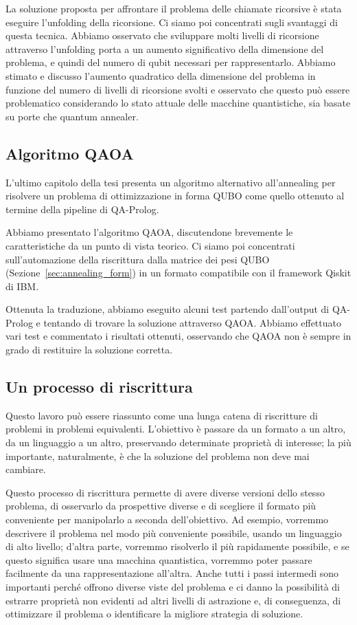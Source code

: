 La soluzione proposta per affrontare il problema delle chiamate ricorsive è stata eseguire l'unfolding della ricorsione. Ci siamo poi concentrati sugli svantaggi di questa tecnica. Abbiamo osservato che sviluppare molti livelli di ricorsione attraverso l'unfolding porta a un aumento significativo della dimensione del problema, e quindi del numero di qubit necessari per rappresentarlo. Abbiamo stimato e discusso l'aumento quadratico della dimensione del problema in funzione del numero di livelli di ricorsione svolti e osservato che questo può essere problematico considerando lo stato attuale delle macchine quantistiche, sia basate su porte che quantum annealer.

\subsection{Algoritmo QAOA}
L'ultimo capitolo della tesi presenta un algoritmo alternativo all'annealing per risolvere un problema di ottimizzazione in forma QUBO come quello ottenuto al termine della pipeline di QA-Prolog.

Abbiamo presentato l'algoritmo QAOA, discutendone brevemente le caratteristiche da un punto di vista teorico. Ci siamo poi concentrati sull'automazione della riscrittura dalla matrice dei pesi QUBO (Sezione~\ref{sec:annealing_form}) in un formato compatibile con il framework Qiskit di IBM.

Ottenuta la traduzione, abbiamo eseguito alcuni test partendo dall'output di QA-Prolog e tentando di trovare la soluzione attraverso QAOA. Abbiamo effettuato vari test e commentato i risultati ottenuti, osservando che QAOA non è sempre in grado di restituire la soluzione corretta.

\subsection{Un processo di riscrittura}
Questo lavoro può essere riassunto come una lunga catena di riscritture di problemi in problemi equivalenti. L'obiettivo è passare da un formato a un altro, da un linguaggio a un altro, preservando determinate proprietà di interesse; la più importante, naturalmente, è che la soluzione del problema non deve mai cambiare.

Questo processo di riscrittura permette di avere diverse versioni dello stesso problema, di osservarlo da prospettive diverse e di scegliere il formato più conveniente per manipolarlo a seconda dell'obiettivo. Ad esempio, vorremmo descrivere il problema nel modo più conveniente possibile, usando un linguaggio di alto livello; d'altra parte, vorremmo risolverlo il più rapidamente possibile, e se questo significa usare una macchina quantistica, vorremmo poter passare facilmente da una rappresentazione all'altra. Anche tutti i passi intermedi sono importanti perché offrono diverse viste del problema e ci danno la possibilità di estrarre proprietà non evidenti ad altri livelli di astrazione e, di conseguenza, di ottimizzare il problema o identificare la migliore strategia di soluzione.

